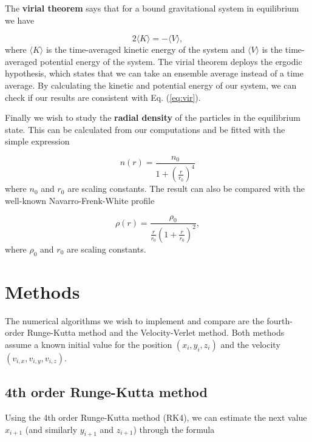 \documentclass{article}
\begin{document}
\begin{multicols}{2}
The \textbf{virial theorem} says that for a bound gravitational system in equilibrium we have

\begin{equation}\label{eq:vir}
	2 \langle K \rangle = - \langle V \rangle,
\end{equation}
where $\langle K \rangle$ is the time-averaged kinetic energy of the system and $\langle V \rangle$ is the time-averaged potential energy of the system. The virial theorem deploys the ergodic hypothesis, which states that we can take an ensemble average instead of a time average. By calculating the kinetic and potential energy of our system, we can check if our results are consistent with Eq. (\ref{eq:vir}).

Finally we wish to study the \textbf{radial density} of the particles in the equilibrium state. This can be calculated from our computations and be fitted with the simple expression

\begin{equation}\label{eq:simple_fit}
	n(r) = \frac{n_0}{1 + (\frac{r}{r_0})^4}
\end{equation}
where $n_0$ and $r_0$ are scaling constants. The result can also be compared with the well-known Navarro-Frenk-White profile

\begin{equation}\label{eq:NFW}
	\rho(r) = \frac{\rho_0}{  \frac{r}{r_0} (1 + \frac{r}{r_0})^2  },
\end{equation}
where $\rho_0$ and $r_0$ are scaling constants. 


\section{Methods}\label{sec:methods}

The numerical algorithms we wish to implement and compare are the fourth-order Runge-Kutta method and the Velocity-Verlet method. Both methods assume a known initial value for the position $(x_i,y_i,z_i)$ and the velocity $(v_{i,x},v_{i,y},v_{i,z})$. 


\subsection{4th order Runge-Kutta method}\label{sec:RK4}
Using the 4th order Runge-Kutta method (RK4), we can estimate the next value $x_{i+1}$ (and similarly $y_{i+1}$ and $z_{i+1}$) through the formula


\end{multicols}
\end{document}
